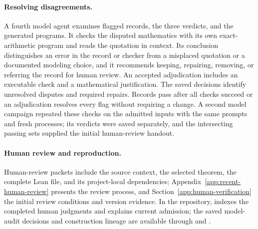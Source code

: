 \paragraph{Resolving disagreements.}
A fourth model agent examines flagged records, the three verdicts, and the generated programs. It checks the disputed mathematics with its own exact-arithmetic program and reads the quotation in context. Its conclusion distinguishes an error in the record or checker from a misplaced quotation or a documented modeling choice, and it recommends keeping, repairing, removing, or referring the record for human review. An accepted adjudication includes an executable check and a mathematical justification. The saved decisions identify unresolved disputes and required repairs. Records pass after all checks succeed or an adjudication resolves every flag without requiring a change. A second model campaign repeated these checks on the admitted inputs with the same prompts and fresh processes; its verdicts were saved separately, and the intersecting passing sets supplied the initial human-review handout.

\paragraph{Human review and reproduction.}
Human-review packets include the source context, the selected theorem, the complete Lean file, and its project-local dependencies; Appendix~\ref{app:recent-human-review} presents the review process, and Section~\ref{app:human-verification} the initial review conditions and version evidence. In the repository,  indexes the completed human judgments and  explains current admission; the saved model-audit decisions and construction lineage are available through  and .
